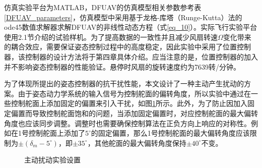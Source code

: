 仿真实验平台为MATLAB，DFUAV的仿真模型相关参数参考表\ref{DFUAV_parameters}，仿真模型中采用基于龙格-库塔（Runge-Kutta）法的ode45数值求解器求解DFUAV的非线性动态方程（式\eqref{eq_10}）。实际飞行实验平台使用2.1节介绍的试验样机。为了提高数据的一致性并且减少风扇转速$\Omega$变化带来的耦合效应，需要保证姿态控制过程中的高度稳定，因此实验中采用了位置控制器，该控制器的设计方法将于第四章具体介绍。应当注意的是，位置控制器的加入并不影响姿态控制器的性能验证。悬停时风扇的旋转速度约为7639转/分钟。

为了体现所提出的姿态控制器的抗干扰性能，本文设计了一种主动产生扰动的方案。由于姿态动力学系统的输入信号为控制舵面的偏转角度，所以实验中通过在一些控制舵面上添加固定的偏置来引入干扰，如图\ref{主动扰动}所示。此外，为了防止因加入固定偏置而导致控制舵面饱和的问题，当添加固定偏置时，对应控制舵面的最大偏转角度也应该同步调整。调整时也需要确保控制算法在正负方向上响应的对称性。例如在1号控制舵面上添加了$5^{\circ}$的固定偏置，那么1号控制舵面的最大偏转角度应该限制为$\pm(\delta_m-5^{\circ})$，即$\pm35^{\circ}$，其他舵面的最大偏转角度保持$\pm40^{\circ}$不变。

\begin{figure}[htbp]
	\centering
    \caption{主动扰动实验设置}\label{主动扰动}
\end{figure}

